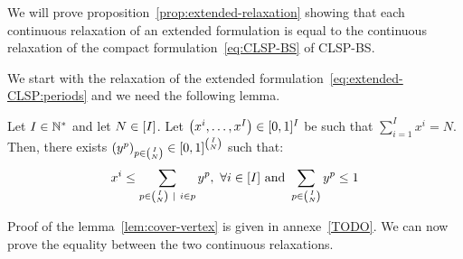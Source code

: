 We will prove proposition~\ref{prop:extended-relaxation} showing that each continuous relaxation of an extended formulation is equal to the continuous relaxation of the compact formulation~\eqref{eq:CLSP-BS} of CLSP-BS.


We start with the relaxation of the extended formulation~\eqref{eq:extended-CLSP:periods} and we need the following lemma.

\begin{lem}\label{lem:cover-vertex}
Let $I\in\mathbb{N}^*$ and let $N\in\range{I}$.
Let $\bracket{x^i,\ldots,x^I}\in\sqbracket{0,1}^I$ be such that $\sum_{i=1}^I x^i = N$.
Then, there exists $\bracket{y^p}_{p\in{I\choose N}}\in\sqbracket{0,1}^{I\choose N}$ such that:
$$x^i \le \sum_{p\in{I\choose N}~|~i\in p}y^p,\ \forall i\in\range{I}\ \mbox{and}\ \sum_{p\in{I\choose N}}y^p \le 1$$
\end{lem}


Proof of the lemma~\ref{lem:cover-vertex} is given in annexe~\ref{TODO}. We can now prove the equality between the two continuous relaxations.


